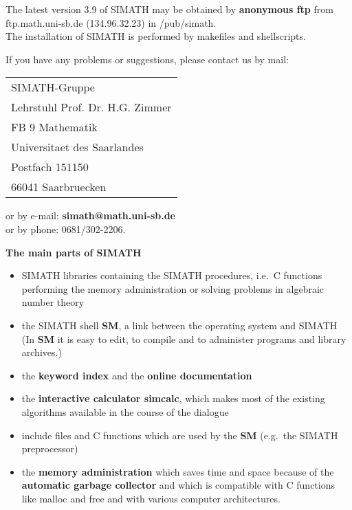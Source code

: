 \vspace{0.4cm} 

\noindent
The latest version 3.9 of SIMATH may be obtained by {\bf anonymous ftp} from
ftp.math.uni-sb.de (134.96.32.23) in /pub/simath.\\
The installation of SIMATH is performed by makefiles and shellscripts.

\vspace{0.4cm}

\noindent
If you have any problems or suggestions, please contact us by mail:
\begin{center}
\begin{tabular}{l}
	SIMATH-Gruppe \\
	Lehrstuhl Prof. Dr. H.G. Zimmer \\
	FB 9 Mathematik \\
	Universitaet des Saarlandes \\
	Postfach 151150 \\
	66041 Saarbruecken 
\end{tabular}
\end{center}
or by e-mail: \hspace{2.5cm} {\bf simath@math.uni-sb.de} \\
or by phone: \hspace{2.5cm} 0681/302-2206.

\vspace{1cm}

\begin{center}
{\Large {\bf The main parts of SIMATH}}
\end{center}

\vspace{0.4cm}

\noindent
\begin{itemize}
\item SIMATH libraries containing the SIMATH procedures, i.e.\ 
C functions performing the memory administration or 
solving problems in algebraic number theory

\item the SIMATH shell {\bf SM}, a link between the operating 
system and SIMATH (In {\bf SM} it is easy to edit, to compile
and to administer programs and library archives.)

\item the {\bf keyword index} and the {\bf online documentation}

\item the {\bf interactive calculator simcalc},
which makes most of the existing algorithms available in the course 
of the dialogue

\item include files and C functions which are used by the {\bf SM} 
(e.g.\ the SIMATH preprocessor)

\item the {\bf memory administration} which saves time and space
because of the {\bf automatic garbage collector} and which is compatible
with C functions like malloc and free and with various computer 
architectures.
\end{itemize}
 
